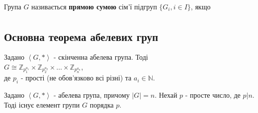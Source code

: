 \documentclass{math_library}
\begin{document}
\begin{definition}
\end{definition}

\begin{definition}
Група $G$ називається \textbf{прямою сумою} сім'ї підгруп $\{G_i, i \in I\}$, якщо
\begin{align*}

\end{align*}
\end{definition}
\fi

\iffalse
\subsection{Основна теорема абелевих груп}
\begin{theorem}
Задано $\left< G, * \right>$ - скінченна абелева група. Тоді\\
$G \cong \mathbb{Z}_{p_1^{a_1}} \times \mathbb{Z}_{p_2^{a_2}} \times \dots \times \mathbb{Z}_{p_n^{a_n}}$,\\
де $p_i$ - прості (не обов'язково всі різні) та $a_i \in \mathbb{N}$.
\end{theorem}

\begin{lemma}
Задано $\left< G, * \right>$ - абелева група, причому $|G| = n$. Нехай $p$ - просте число, де $p| n $. Тоді існує елемент групи $G$ порядка $p$.
\end{lemma}
\end{document}
